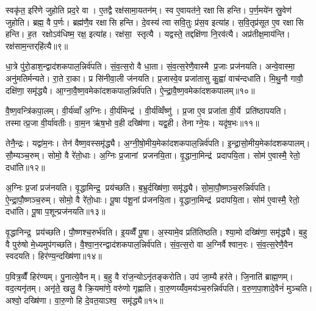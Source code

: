 स्वकृ॑त॒ इरि॑णे जुहोति प्रद॒रे वा। ए॒तद्वै रक्ष॑सामा॒यतन॑म्। स्व ए॒वायत॑ने॒ रक्षासि हन्ति। प॒र्ण॒मये॑न स्रु॒वेण॑ जुहोति। ब्रह्म॒ वै प॒र्णः। ब्रह्म॑णै॒व रक्षासि हन्ति। दे॒वस्य॑ त्वा सवि॒तुः प्र॑स॒व इत्या॑ह। स॒वि॒तृप्र॑सूत ए॒व रक्षासि हन्ति। ह॒त रक्षोऽव॑धिष्म॒ रक्ष॒ इत्या॑ह। रक्ष॑सा॒ स्तृत्यै। यद्वस्ते॒ तद्दक्षि॑णा नि॒रव॑त्यै। अप्र॑तीक्ष॒माय॑न्ति। रक्ष॑साम॒न्तर्‌हि॑त्यै॥९॥\anuvakamend[य॒च्छ॒ति॒ वरु॑ण॒न्तृती॑य॒व्विँजि॑त्या असृजत॒ समृ॑द्ध्यै हनो॒ मित्र॑द्रु॒गिति॑ हन्ति॒ स्तृत्यै॒ त्रीणि॑ च]

धा॒त्रे पु॑रो॒डाश॒न्द्वाद॑शकपाल॒न्निर्व॑पति। सं॒व॒त्स॒रो वै धा॒ता। सं॒व॒त्स॒रेणै॒वास्मै प्र॒जाः प्रज॑नयति। अन्वे॒वास्मा॒ अनु॑मतिर्मन्यते। रा॒ते रा॒का। प्र सि॑नीवा॒ली ज॑नयति। प्र॒जास्वे॒व प्रजा॑तासु कु॒ह्वा॑ वाच॑न्दधाति। मि॒थु॒नौ गावौ॒ दक्षि॑णा॒ समृ॑द्ध्यै। आ॒ग्ना॒वै॒ष्ण॒वमेका॑दशकपाल॒न्निर्व॑पति। ऐ॒न्द्रा॒वै॒ष्ण॒वमेका॑दशकपालम्॥१०॥

वै॒ष्ण॒वन्त्रि॑कपा॒लम्। वी॒र्य॑व्वाँ अ॒ग्निः। वी॒र्य॑मिन्द्र॑। वी॒र्य॑व्विँष्णु॑। प्र॒जा ए॒व प्रजा॑ता वी॒र्ये प्रति॑ष्ठापयति। तस्मात्प्र॒जा वी॒र्या॑वतीः। वा॒म॒न ऋ॑ष॒भो व॒ही दख्षि॑णा। यद्व॒ही। तेनाग्ने॒यः। यदृ॑ष॒भः॥११॥

तेनै॒न्द्रः। यद्वा॑म॒नः। तेन॑ वैष्ण॒वस्समृ॑द्ध्यै। अ॒ग्नी॒षो॒मीय॒मेका॑दशकपाल॒न्निर्व॑पति। इ॒न्द्रा॒सो॒मीय॒मेका॑दशकपालम्। सौ॒म्यञ्च॒रुम्। सोमो॒ वै रे॑तो॒धाः। अ॒ग्निः प्र॒जानां प्रजनयि॒ता। वृ॒द्धाना॒मिन्द्र॑ प्रदापयि॒ता। सोम॑ ए॒वास्मै॒ रेतो॒ दधा॑ति॥१२॥

अ॒ग्निः प्र॒जां प्रज॑नयति। वृ॒द्धामिन्द्र॒ प्रय॑च्छति। ब॒भ्रुर्दख्षि॑णा॒ समृ॑द्ध्यै। सो॒मा॒पौ॒ष्णञ्च॒रुन्निर्व॑पति। ऐ॒न्द्रा॒पौ॒ष्णञ्च॒रुम्। सोमो॒ वै रे॑तो॒धाः। पू॒षा प॑शू॒नां प्र॑जनयि॒ता। वृ॒द्धाना॒मिन्द्र॑ प्रदापयि॒ता। सोम॑ ए॒वास्मै॒ रेतो॒ दधा॑ति। पू॒षा प॒शून्प्रज॑नयति॥१३॥

वृ॒द्धानिन्द्र॒ प्रय॑च्छति। पौ॒ष्णश्च॒रुर्भ॑वति। इ॒यव्वैँ पू॒षा। अ॒स्यामे॒व प्रति॑तिष्ठति। श्या॒मो दख्षि॑णा॒ समृ॑द्ध्यै। ब॒हु वै पुरु॑षो मे॒ध्यमुप॑गच्छति। वै॒श्वा॒न॒रन्द्वाद॑शकपाल॒न्निर्व॑पति। सं॒व॒त्स॒रो वा अ॒ग्निर्वैश्वान॒रः। सं॒व॒त्स॒रेणै॒वैन स्वदयति। हिर॑ण्य॒न्दख्षि॑णा॥१४॥

प॒वित्र॒व्वैँ हिर॑ण्यम्। पु॒नात्ये॒वैनम्। ब॒हु वै रा॑ज॒न्योऽनृ॑तङ्करोति। उप॑ जा॒म्यै हर॑ते। जि॒नाति॑ ब्राह्म॒णम्। वद॒त्यनृ॑तम्। अनृ॑ते॒ खलु॒ वै क्रि॒यमा॑णे॒ वरु॑णो गृह्णाति। वा॒रु॒णय्यँ॑व॒मय॑ञ्च॒रुन्निर्व॑पति। व॒रु॒ण॒पा॒शादे॒वैनं॑ मुञ्चति। अश्वो॒ दख्षि॑णा। वा॒रु॒णो हि दे॒वत॒याऽश्व॒ समृ॑द्ध्यै॥१५॥

